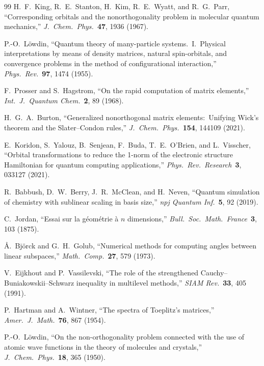 \documentclass[aps,pra,twocolumn,superscriptaddress,longbibliography]{revtex4-2}
\begin{document}
\begin{thebibliography}{99}
H.~F.~King, R.~E.~Stanton, H.~Kim, R.~E.~Wyatt, and R.~G.~Parr,
``Corresponding orbitals and the nonorthogonality problem in molecular
quantum mechanics,'' \textit{J.\ Chem.\ Phys.}\ \textbf{47}, 1936 (1967).

P.-O.~L\"owdin, ``Quantum theory of many-particle systems.\ I.\ Physical
interpretations by means of density matrices, natural spin-orbitals, and
convergence problems in the method of configurational interaction,''
\textit{Phys.\ Rev.}\ \textbf{97}, 1474 (1955).

F.~Prosser and S.~Hagstrom, ``On the rapid computation of matrix
elements,'' \textit{Int.\ J.\ Quantum Chem.}\ \textbf{2}, 89 (1968).

H.~G.~A.~Burton, ``Generalized nonorthogonal matrix elements:\ Unifying
Wick's theorem and the Slater--Condon rules,''
\textit{J.\ Chem.\ Phys.}\ \textbf{154}, 144109 (2021).

E.~Koridon, S.~Yalouz, B.~Senjean, F.~Buda, T.~E.~O'Brien, and
L.~Visscher, ``Orbital transformations to reduce the 1-norm of the
electronic structure Hamiltonian for quantum computing applications,''
\textit{Phys.\ Rev.\ Research}\ \textbf{3}, 033127 (2021).

R.~Babbush, D.~W.~Berry, J.~R.~McClean, and H.~Neven, ``Quantum
simulation of chemistry with sublinear scaling in basis size,''
\textit{npj Quantum Inf.}\ \textbf{5}, 92 (2019).

C.~Jordan, ``Essai sur la g\'eom\'etrie \`a $n$ dimensions,''
\textit{Bull.\ Soc.\ Math.\ France}\ \textbf{3}, 103 (1875).

\AA.~Bj\"orck and G.~H.~Golub, ``Numerical methods for computing angles between
linear subspaces,'' \textit{Math.\ Comp.}\ \textbf{27}, 579 (1973).

V.~Eijkhout and P.~Vassilevski, ``The role of the strengthened
Cauchy--Buniakowskii--Schwarz inequality in multilevel methods,''
\textit{SIAM Rev.}\ \textbf{33}, 405 (1991).

P.~Hartman and A.~Wintner, ``The spectra of Toeplitz's matrices,''
\textit{Amer.\ J.\ Math.}\ \textbf{76}, 867 (1954).

P.-O.~L\"owdin, ``On the non-orthogonality problem connected with the use of
atomic wave functions in the theory of molecules and crystals,''
\textit{J.\ Chem.\ Phys.}\ \textbf{18}, 365 (1950).


\end{thebibliography}
\end{document}
